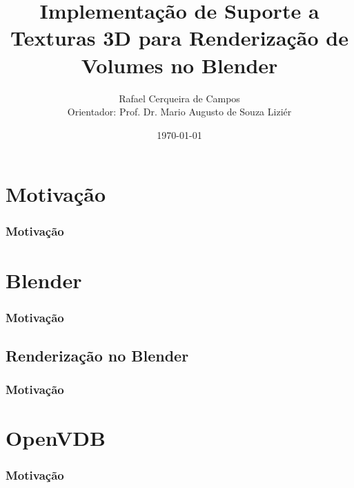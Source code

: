 \documentclass{beamer}
\title[Defesa]{Implementação de Suporte a Texturas 3D para Renderização de
Volumes no Blender}
\author[Rafael Campos]{Rafael Cerqueira de Campos \\ Orientador: Prof. Dr. Mario Augusto de Souza Liziér}
\institute[DC - UFSCAR]{Graduação em Engenharia de Computação - UFSCar}
\date{\today}
\begin{document}
\frame{\titlepage}

\AtBeginSubsection[]

\begin{frame}[allowframebreaks]
\tableofcontents
\end{frame}

\section{Motivação}

\begin{frame}

\frametitle{Motivação}


\end{frame}

\section{Blender}

\begin{frame}

\frametitle{Motivação}



\end{frame}
\subsection{Renderização no Blender}

\begin{frame}

\frametitle{Motivação}



\end{frame}
\section{OpenVDB}

\begin{frame}

\frametitle{Motivação}


\end{frame}
\end{document}
